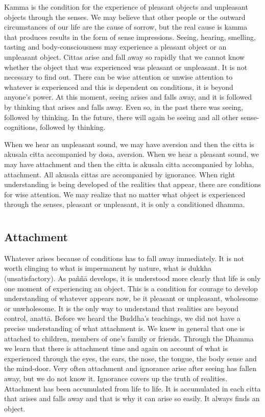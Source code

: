 Kamma is the condition for the experience of pleasant objects and unpleasant 
objects through the senses. We may believe that other people or the outward 
circumstances of our life are the cause of sorrow, but the real cause is kamma 
that produces results in the form of sense impressions. Seeing, hearing, smelling, tasting and body-consciousness may experience a pleasant object or an unpleasant object. Cittas arise and fall away so rapidly that we cannot know 
whether the object that was experienced was pleasant or unpleasant. It is not 
necessary to find out. There can be wise attention or unwise attention to whatever is experienced and this is dependent on conditions, it is beyond anyone's 
power. At this moment, seeing arises and falls away, and it is followed by thinking that arises and falls away. Even so, in the past there was seeing, followed by 
thinking. In the future, there will again be seeing and all other sense-cognitions, 
followed by thinking. 

When we hear an unpleasant sound, we may have aversion and then the citta is 
akusala citta accompanied by dosa, aversion. When we hear a pleasant sound, 
we may have attachment and then the citta is akusala citta accompanied by lobha, attachment. All akusala cittas are accompanied by ignorance. When right 
understanding is being developed of the realities that appear, there are conditions for wise attention. We may realize that no matter what object is experienced through the senses, pleasant or unpleasant, it is only a conditioned 
dhamma. 

\chapter[Attachment]{}
\section*{Attachment}

Whatever arises because of conditions has to fall away immediately. It is not 
worth clinging to what is impermanent by nature, what is dukkha (unsatisfactory). As paññā develops, it is understood more clearly that life is only one moment of experiencing an object. This is a condition for courage to develop understanding of whatever appears now, be it pleasant or unpleasant, wholesome 
or unwholesome. It is the only way to understand that realities are beyond control, anattā. 
Before we heard the Buddha's teachings, we did not have a precise understanding of what attachment is. We knew in general that one is attached to children, 
members of one's family or friends. Through the Dhamma we learn that there is 
attachment time and again on account of what is experienced through the eyes, 
the ears, the nose, the tongue, the body sense and the mind-door. Very often attachment and ignorance arise after seeing has fallen away, but we do not know 
it. Ignorance covers up the truth of realities. Attachment has been accumulated 
from life to life. It is accumulated in each citta that arises and falls away and 
that is why it can arise so easily. It always finds an object. 

